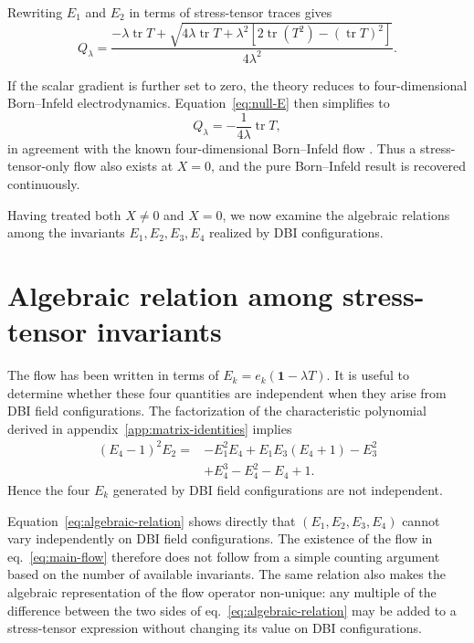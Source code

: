 \documentclass[a4paper,11pt]{article}
\numberwithin{equation}{section}
\newcommand{\tr}{\operatorname{tr}}
\newcommand{\Id}{\mathbf 1}
\begin{document}
Rewriting $E_1$ and $E_2$ in terms of stress-tensor traces gives
\begin{equation}
 Q_\lambda
 =\frac{-\lambda\tr T+
 \sqrt{4\lambda\tr T+\lambda^2\left[2\tr(T^2)-(\tr T)^2\right]}}
 {4\lambda^2}.
 \label{eq:null-T}
\end{equation}

If the scalar gradient is further set to zero, the theory reduces to four-dimensional Born--Infeld electrodynamics. Equation~\eqref{eq:null-E} then simplifies to
\begin{equation}
 Q_\lambda=-\frac{1}{4\lambda}\tr T,
 \label{eq:pure-BI}
\end{equation}
in agreement with the known four-dimensional Born--Infeld flow \cite{Ferko2022,Brizio2026}. Thus a stress-tensor-only flow also exists at $X=0$, and the pure Born--Infeld result is recovered continuously.

Having treated both $X\neq0$ and $X=0$, we now examine the algebraic relations among the invariants $E_1,E_2,E_3,E_4$ realized by DBI configurations.

\section{Algebraic relation among stress-tensor invariants}
\label{sec:constraint}

The flow has been written in terms of $E_k=e_k(\Id-\lambda T)$. It is useful to determine whether these four quantities are independent when they arise from DBI field configurations. The factorization of the characteristic polynomial derived in appendix~\ref{app:matrix-identities} implies
\begin{align}
 (E_4-1)^2E_2={}&-E_1^2E_4+E_1E_3(E_4+1)-E_3^2\nonumber\\
 &+E_4^3-E_4^2-E_4+1.
 \label{eq:algebraic-relation}
\end{align}
Hence the four $E_k$ generated by DBI field configurations are not independent.

Equation~\eqref{eq:algebraic-relation} shows directly that $(E_1,E_2,E_3,E_4)$ cannot vary independently on DBI field configurations. The existence of the flow in eq.~\eqref{eq:main-flow} therefore does not follow from a simple counting argument based on the number of available invariants. The same relation also makes the algebraic representation of the flow operator non-unique: any multiple of the difference between the two sides of eq.~\eqref{eq:algebraic-relation} may be added to a stress-tensor expression without changing its value on DBI configurations.
\end{document}
